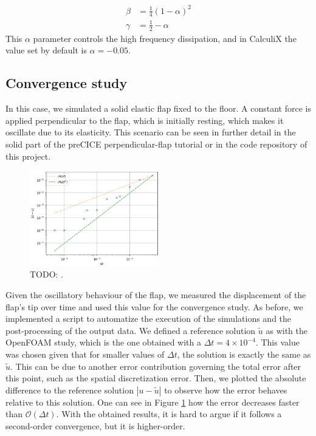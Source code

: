 \documentclass[
  english,        %
  font=times,     %
  onecolumn,      %
]{tumarticle}
\begin{document}
\begin{align}
    \beta &= \frac{1}{4}(1 - \alpha)^2 \\
    \gamma &= \frac{1}{2} - \alpha
\end{align}
This $\alpha$ parameter controls the high frequency dissipation, and in CalculiX the value set by default is $\alpha=-0.05$.

\subsection{Convergence study}
In this case, we simulated a solid elastic flap fixed to the floor. A constant force is applied perpendicular to the flap, which is initially resting, which makes it oscillate due to its elasticity. This scenario can be seen in further detail in the solid part of the preCICE perpendicular-flap tutorial \cite{perpendicularFlap} or in the code repository of this project.

\begin{figure}[!ht]
    \centering
    \includegraphics[width=0.5\textwidth]{resources/calculix_convergence_study.png}
    \caption{TODO: .}
    \label{fig:calculix_convergence}
\end{figure}

Given the oscillatory behaviour of the flap, we measured the displacement of the flap's tip over time and used this value for the convergence study. As before, we implemented a script to automatize the execution of the simulations and the post-processing of the output data. We defined a reference solution $\tilde{u}$ as with the OpenFOAM study, which is the one obtained with a $\Delta t = 4\times 10^{-4}$. This value was chosen given that for smaller values of $\Delta t$, the solution is exactly the same as $\tilde{u}$. This can be due to another error contribution governing the total error after this point, such as the spatial discretization error. Then, we plotted the absolute difference to the reference solution $|u - \tilde{u}|$ to observe how the error behaves relative to this solution. One can see in Figure \ref{fig:calculix_convergence} how the error decreases faster than $\mathcal{O}(\Delta t)$. With the obtained results, it is hard to argue if it follows a second-order convergence, but it is higher-order.
\end{document}
